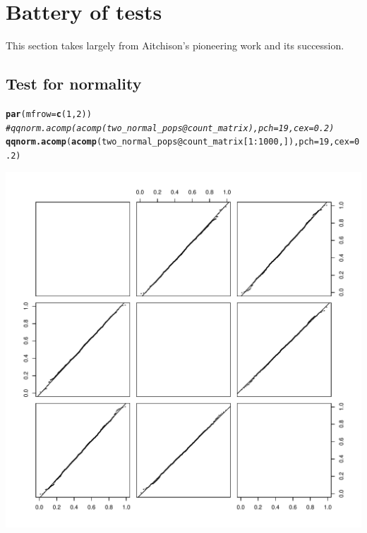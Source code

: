 \documentclass{article}\usepackage[]{graphicx}\usepackage[]{color}
\makeatletter
\def\maxwidth{ %
  \ifdim\Gin@nat@width>\linewidth
    \linewidth
  \else
    \Gin@nat@width
  \fi
}
\newcommand{\hlnum}[1]{\textcolor[rgb]{0.686,0.059,0.569}{#1}}%
\newcommand{\hlcom}[1]{\textcolor[rgb]{0.678,0.584,0.686}{\textit{#1}}}%
\newcommand{\hlopt}[1]{\textcolor[rgb]{0,0,0}{#1}}%
\newcommand{\hlstd}[1]{\textcolor[rgb]{0.345,0.345,0.345}{#1}}%
\newcommand{\hlkwc}[1]{\textcolor[rgb]{0.333,0.667,0.333}{#1}}%
\newcommand{\hlkwd}[1]{\textcolor[rgb]{0.737,0.353,0.396}{\textbf{#1}}}%
\newenvironment{kframe}{%
 \def\at@end@of@kframe{}%
 \ifinner\ifhmode%
  \def\at@end@of@kframe{\end{minipage}}%
  \begin{minipage}{\columnwidth}%
 \fi\fi%
 \def\FrameCommand##1{\hskip\@totalleftmargin \hskip-\fboxsep
 \colorbox{shadecolor}{##1}\hskip-\fboxsep
     \hskip-\linewidth \hskip-\@totalleftmargin \hskip\columnwidth}%
 \MakeFramed {\advance\hsize-\width
   \@totalleftmargin\z@ \linewidth\hsize
   \@setminipage}}%
 {\par\unskip\endMakeFramed%
 \at@end@of@kframe}
\newenvironment{knitrout}{}{} %
\makeatother
\begin{document}
\clearpage
\section{Battery of tests}
This section takes largely from Aitchison's pioneering work\cite{aitchison1982statistical} and its succession\cite{pawlowsky2015modeling}.

\subsection{Test for normality}
\begin{knitrout}
\color{fgcolor}\begin{kframe}
\begin{alltt}
\hlkwd{par}\hlstd{(}\hlkwc{mfrow}\hlstd{=}\hlkwd{c}\hlstd{(}\hlnum{1}\hlstd{,}\hlnum{2}\hlstd{))}
\hlcom{# qqnorm.acomp(acomp(two_normal_pops@count_matrix), pch=19, cex=0.2)}
\hlkwd{qqnorm.acomp}\hlstd{(}\hlkwd{acomp}\hlstd{(two_normal_pops}\hlopt{@}\hlkwc{count_matrix}\hlstd{[}\hlnum{1}\hlopt{:}\hlnum{1000}\hlstd{,]),} \hlkwc{pch}\hlstd{=}\hlnum{19}\hlstd{,} \hlkwc{cex}\hlstd{=}\hlnum{0.2}\hlstd{)}
\end{alltt}
\end{kframe}
\includegraphics[width=\maxwidth]{figure/unnamed-chunk-11-1} 

\end{knitrout}
\end{document}
